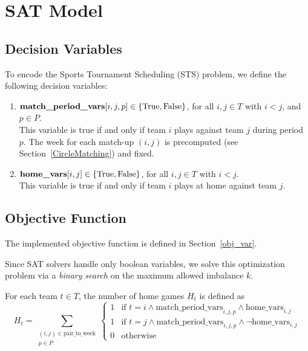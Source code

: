 \section{SAT Model}

\subsection{Decision Variables}
To encode the Sports Tournament Scheduling (STS) problem, we define the following decision variables:
\begin{enumerate}
    \item $\text{\textbf{match\_period\_vars}}[i,j,p] \in \{\mathrm{True}, \mathrm{False}\}$, for all $i,j \in T$ with $i < j$, and $p \in P$. \\
    This variable is true if and only if team $i$ plays against team $j$ during period $p$. The week for each match-up $(i,j)$ is precomputed (see Section~\ref{CircleMatching}) and fixed.
    
    \item $\text{\textbf{home\_vars}}[i,j] \in \{\mathrm{True}, \mathrm{False}\}$, for all $i,j \in T$ with $i < j$. \\
    This variable is true if and only if team $i$ plays at home against team $j$.
\end{enumerate}

\subsection{Objective Function}
The implemented objective function is defined in Section~\ref{obj_var}.

Since SAT solvers handle only boolean variables, we solve this optimization problem via a \emph{binary search} on the maximum allowed imbalance $k$.

For each team $t \in T$, the number of home games $H_t$ is defined as
\[
H_t = \sum_{\substack{(i,j) \in \text{pair\_to\_week} \\ p \in P}}
\begin{cases}
1 & \text{if } t = i \land \text{match\_period\_vars}_{i,j,p} \land \text{home\_vars}_{i,j} \\
1 & \text{if } t = j \land \text{match\_period\_vars}_{i,j,p} \land \neg \text{home\_vars}_{i,j} \\
0 & \text{otherwise}
\end{cases}
\]

